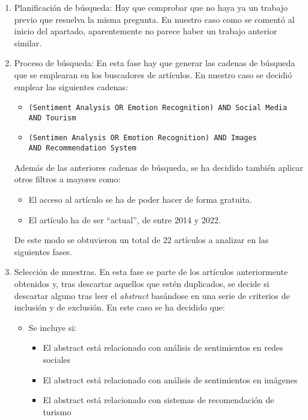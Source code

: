 \begin{enumerate}
    \item Planificación de búsqueda: Hay que comprobar que no haya ya un trabajo previo que resuelva la misma pregunta. En nuestro caso como se comentó al inicio del apartado, aparentemente no parece haber un trabajo anterior similar.
    \item Proceso de búsqueda: En esta fase hay que generar las cadenas de búsqueda que se emplearan en los buscadores de artículos. En nuestro caso se decidió emplear las siguientes cadenas:
    \begin{itemize}
        \item \texttt{(Sentiment Analysis OR Emotion Recognition) AND Social Media AND Tourism}
        \item \texttt{(Sentimen Analysis OR Emotion Recognition) AND Images \\
        AND Recommendation System}
    \end{itemize}
    
    Además de las anteriores cadenas de búsqueda, se ha decidido también aplicar otros filtros a mayores como:
    
    \begin{itemize}
        \item El acceso al artículo se ha de poder hacer de forma gratuita.
        \item El artículo ha de ser ``actual'', de entre 2014 y 2022.
    \end{itemize}
    
    De este modo se obtuvieron un total de 22 artículos a analizar en las siguientes fases.

    \item Selección de muestras. En esta fase se parte de los artículos anteriormente obtenidos y, tras descartar aquellos que estén duplicados, se decide si descartar alguno tras leer el \textit{abstract} basándose en una serie de criterios de inclusión y de exclusión. En este caso se ha decidido que:

    \begin{itemize}
        \item Se incluye si:
        \begin{itemize}
            \item El abstract está relacionado con análisis de sentimientos en redes sociales
            \item El abstract está relacionado con análisis de sentimientos en imágenes
            \item El abstract está relacionado con sistemas de recomendación de turismo
        \end{itemize}
        

\end{itemize}
\end{enumerate}
